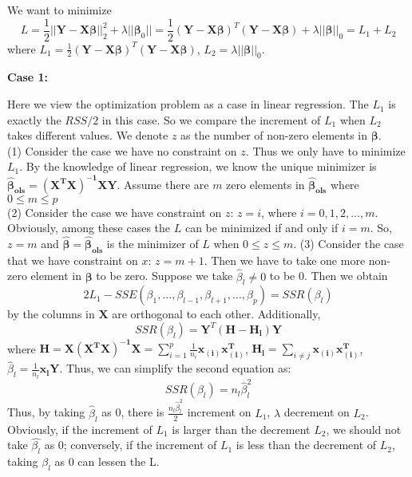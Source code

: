 \documentclass{article}
\begin{document}
\begin{appendices}
	

		We want to minimize
		\begin{equation*}
		L=\frac{1}{2}||\mathbf{Y-X}\bm{\beta}||^2_2+\lambda||\bm{\beta}_0||=\frac{1}{2}(\mathbf{Y-X}\bm{\beta})^T(\mathbf{Y-X}\bm{\beta})+\lambda ||\bm{\beta}||_0=L_1+L_2
		\end{equation*} 
		where $L_1=\frac{1}{2}(\mathbf{Y-X}\bm{\beta})^T(\mathbf{Y-X}\bm{\beta})$, $L_2=\lambda ||\bm{\beta}||_0$. 
	
	\textbf{Case 1:}\par 
	 Here we view the optimization problem as a case in linear regression. 
	The $L_1$ is exactly the $RSS/2$ in this case. So we compare the increment of $L_1$  when $L_2$ takes different values. We denote $z$ as the number of  non-zero elements in $\bm{\beta}$.\\
	(1) Consider the case we have no constraint on $z$. Thus we only have to minimize $L_1$. By the knowledge of linear regression, we know the unique minimizer is $\bm{\hat{\beta}_{ols}}=\mathbf{(X^TX)^{-1}XY}$. Assume there are $m$ zero elements in $\bm{\hat{\beta}_{ols}}$ where $0\leq m \leq p$ \\
	(2) Consider the case we have constraint on $z$: $z = i$, where $i=0,1,2,...,m$. Obviously, among these cases the $L$ can be minimized if and only if $i=m$. So, $z=m$ and $\bm{\hat{\beta}}=\bm{\hat{\beta}_{ols}}$ is the minimizer of $L$ when $0\leq z\leq m$.
	(3) Consider the case that we have constraint on $x$: $z=m+1$. Then we have to take one more non-zero element in $\bm{\beta}$ to be zero. Suppose we take $\hat{\beta}_l \neq 0$ to be 0. Then we obtain 
	\begin{equation*}
		2L_1 -SSE(\beta_1,...,\beta_{l-1},\beta_{l+1},...,\beta_p)=SSR(\beta_l)
	\end{equation*}
	by the columns in $\mathbf{X}$ are orthogonal to each other. Additionally,
	\begin{equation*}
		SSR(\beta_l) = \mathbf{Y}^T(\mathbf{H-H_l})\mathbf{Y} 
	\end{equation*}
	where $\mathbf{H=X(X^TX)^{-1}X}=\sum_{i=1}^p\frac{1}{n_i}\mathbf{x_{(i)}x_{(i)}^T}$, $\mathbf{H_l} = \sum_{i\neq j}\mathbf{x_{(i)}x_{(i)}^T}$, $\hat{\beta}_l = \frac{1}{n_l}\mathbf{x_{l}Y}$. Thus, we can simplify the second equation as:
	\begin{equation*}
		SSR(\beta_l) = n_l\hat{\beta}_l^2
	\end{equation*}
	Thus, by taking $\hat{\beta}_l$ as 0, there is $\frac{n_l\hat{\beta}_l^2}{2}$ increment on $L_1$, $\lambda$ decrement on $L_2$. Obviously, if the increment of $L_1$ is larger than the decrement $L_2$, we should not take $\hat{\beta_l}$ as 0; conversely, if the increment of $L_1$ is less than the decrement of $L_2$, taking $\hat{\beta_l}$ as 0 can lessen the L.\\

\end{appendices}
\end{document}

